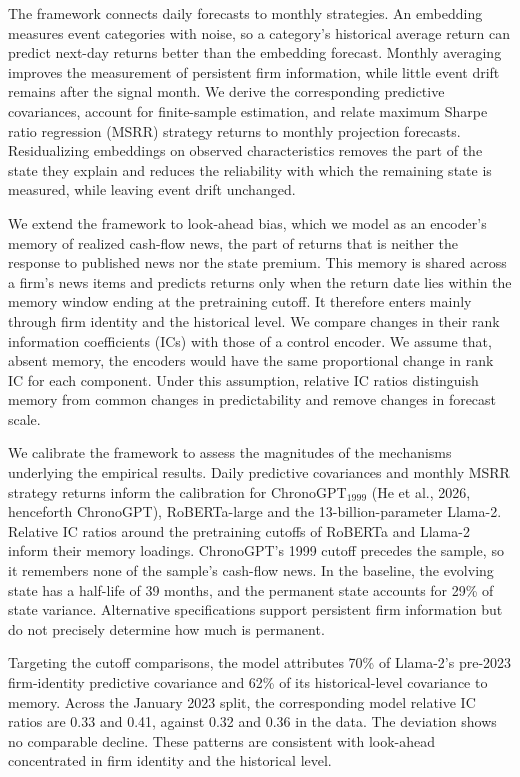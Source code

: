 \documentclass[11pt,letterpaper]{article}
\theoremstyle{remark}
\begin{document}
The framework connects daily forecasts to monthly strategies. An embedding measures event categories with noise, so a category's historical average return can predict next-day returns better than the embedding forecast. Monthly averaging improves the measurement of persistent firm information, while little event drift remains after the signal month. We derive the corresponding predictive covariances, account for finite-sample estimation, and relate maximum Sharpe ratio regression (MSRR) strategy returns to monthly projection forecasts. Residualizing embeddings on observed characteristics removes the part of the state they explain and reduces the reliability with which the remaining state is measured, while leaving event drift unchanged.

We extend the framework to look-ahead bias, which we model as an encoder's memory of realized cash-flow news, the part of returns that is neither the response to published news nor the state premium. This memory is shared across a firm's news items and predicts returns only when the return date lies within the memory window ending at the pretraining cutoff. It therefore enters mainly through firm identity and the historical level. We compare changes in their rank information coefficients (ICs) with those of a control encoder. We assume that, absent memory, the encoders would have the same proportional change in rank IC for each component. Under this assumption, relative IC ratios distinguish memory from common changes in predictability and remove changes in forecast scale.

We calibrate the framework to assess the magnitudes of the mechanisms underlying the empirical results. Daily predictive covariances and monthly MSRR strategy returns inform the calibration for ChronoGPT$_{1999}$ (He et al., 2026, henceforth ChronoGPT), RoBERTa-large and the 13-billion-parameter Llama-2. Relative IC ratios around the pretraining cutoffs of RoBERTa and Llama-2 inform their memory loadings. ChronoGPT's 1999 cutoff precedes the sample, so it remembers none of the sample's cash-flow news. In the baseline, the evolving state has a half-life of 39 months, and the permanent state accounts for 29\% of state variance. Alternative specifications support persistent firm information but do not precisely determine how much is permanent.

Targeting the cutoff comparisons, the model attributes 70\% of Llama-2's pre-2023 firm-identity predictive covariance and 62\% of its historical-level covariance to memory. Across the January 2023 split, the corresponding model relative IC ratios are 0.33 and 0.41, against 0.32 and 0.36 in the data. The deviation shows no comparable decline. These patterns are consistent with look-ahead concentrated in firm identity and the historical level.
\end{document}
